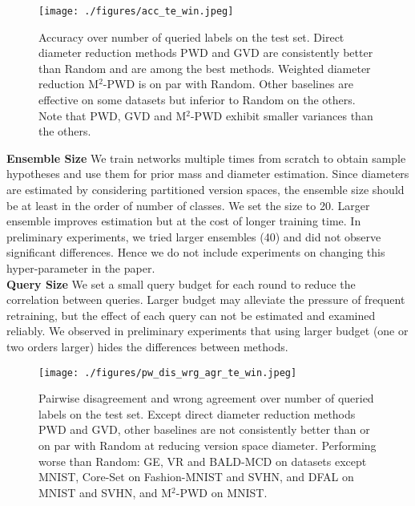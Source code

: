 \documentclass[runningheads, envcountsame, a4paper]{llncs}
\begin{document}
\begin{figure*}[t!]
	\begin{center}
		\texttt{[image: ./figures/acc\_te\_win.jpeg]}
	\end{center}
	\caption{Accuracy over number of queried labels on the test set. Direct diameter reduction methods PWD and GVD are consistently better than Random and are among the best methods. Weighted diameter reduction M$^2$-PWD is on par with Random. Other baselines are effective on some datasets but inferior to Random on the others. Note that PWD, GVD and M$^2$-PWD exhibit smaller variances than the others.}
	\label{fig:acc_te}
\end{figure*}


\noindent\textbf{Ensemble Size} 
We train networks multiple times from scratch to obtain sample hypotheses and use them for prior mass and diameter estimation. Since diameters are estimated by considering partitioned version spaces, the ensemble size should be at least in the order of number of classes. We set the size to 20. Larger ensemble improves estimation but at the cost of longer training time. In preliminary experiments, we tried larger ensembles (40) and did not observe significant differences. Hence we do not include experiments on changing this hyper-parameter in the paper. \\

\noindent\textbf{Query Size} 
We set a small query budget for each round to reduce the correlation between queries. Larger budget may alleviate the pressure of frequent retraining, but the effect of each query can not be estimated and examined reliably. We observed in preliminary experiments that using larger budget (one or two orders larger) hides the differences between methods. 


\begin{figure*}[ht!]
\begin{center}
\texttt{[image: ./figures/pw\_dis\_wrg\_agr\_te\_win.jpeg]}
\end{center}
   \caption{Pairwise disagreement and wrong agreement over number of queried labels on the test set. Except direct diameter reduction methods PWD and GVD, other baselines are not consistently better than or on par with Random at reducing version space diameter. Performing worse than Random: GE, VR and BALD-MCD on datasets except MNIST, Core-Set on Fashion-MNIST and SVHN, and DFAL on MNIST and SVHN, and M$^2$-PWD on MNIST.}
\label{fig:pw_dis_wrg_agr_te}
\end{figure*}
\end{document}
